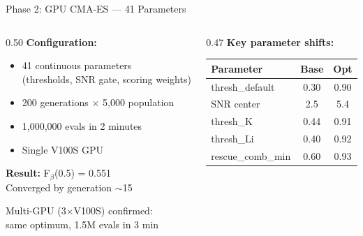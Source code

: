 \documentclass[aspectratio=169,12pt]{beamer}
\begin{document}
\begin{frame}{Phase 2: GPU CMA-ES --- 41 Parameters}
  \begin{columns}[T]
    \begin{column}{0.50\textwidth}
      \textbf{Configuration:}
      \begin{itemize}
        \item 41 continuous parameters\\
              {\scriptsize (thresholds, SNR gate, scoring weights)}
        \item 200 generations $\times$ 5{,}000 population
        \item \alert{1{,}000{,}000 evals in 2 minutes}
        \item Single V100S GPU
      \end{itemize}

      \vspace{0.5em}
      \textbf{Result:} F$_\beta$(0.5) = \alert{0.551}\\
      Converged by generation $\sim$15

      \vspace{0.3em}
      Multi-GPU (3$\times$V100S) confirmed:\\
      same optimum, 1.5M evals in 3 min
    \end{column}
    \begin{column}{0.47\textwidth}
      \textbf{Key parameter shifts:}
      {\small
      \begin{table}
        \begin{tabular}{@{}lcc@{}}
          \toprule
          Parameter & Base & Opt \\
          \midrule
          thresh\_default & 0.30 & \alert{0.90} \\
          SNR center & 2.5 & \alert{5.4} \\
          thresh\_K & 0.44 & 0.91 \\
          thresh\_Li & 0.40 & 0.92 \\
          rescue\_comb\_min & 0.60 & 0.93 \\
          \bottomrule
        \end{tabular}
      \end{table}
      }


\end{column}
\end{columns}
\end{frame}
\end{document}
